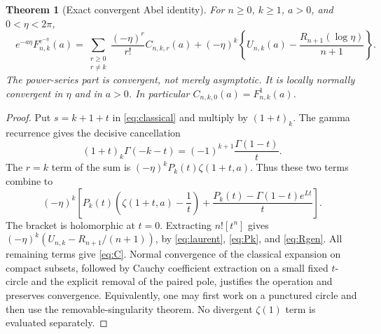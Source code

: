 \documentclass[11pt,letterpaper]{article}
\numberwithin{equation}{section}
\newtheorem{theorem}{Theorem}[section]
\theoremstyle{definition}\newtheorem{definition}[theorem]{Definition}
\theoremstyle{remark}\newtheorem{remark}[theorem]{Remark}
\newcommand{\F}[3]{F_{#1,#2}^{#3}}
\newcommand{\coef}[2]{[#1^{#2}]}
\begin{document}
\begin{theorem}[Exact convergent Abel identity]\label{thm:abel}
For $n\ge0$, $k\ge1$, $a>0$, and $0<\eta<2\pi$,
\begin{equation}\label{eq:abel}
 \boxed{\quad
 e^{-a\eta}\F nk{e^{-\eta}}(a)
 =\sum_{\substack{r\ge0\\r\ne k}}
       \frac{(-\eta)^r}{r!}C_{n,k,r}(a)
  +(-\eta)^k\left\{U_{n,k}(a)-\frac{R_{n+1}(\log\eta)}{n+1}\right\}.
 \quad}
\end{equation}
The power-series part is convergent, not merely asymptotic. It is locally normally convergent in $\eta$ and in $a>0$. In particular $C_{n,k,0}(a)=\F nk1(a)$.
\end{theorem}
\begin{proof}
Put $s=k+1+t$ in \eqref{eq:classical} and multiply by $(1+t)_k$. The gamma recurrence gives the decisive cancellation
\begin{equation}\label{eq:universal-cancel}
 (1+t)_k\Gamma(-k-t)=(-1)^{k+1}\frac{\Gamma(1-t)}t.
\end{equation}
The $r=k$ term of the sum is $(-\eta)^kP_k(t)\zeta(1+t,a)$. Thus these two terms combine to
\[
 (-\eta)^k\left[
 P_k(t)\left(\zeta(1+t,a)-\frac1t\right)
 +\frac{P_k(t)-\Gamma(1-t)e^{Lt}}t\right].
\]
The bracket is holomorphic at $t=0$. Extracting $n!\coef tn$ gives $(-\eta)^k(U_{n,k}-R_{n+1}/(n+1))$, by \eqref{eq:laurent}, \eqref{eq:Pk}, and \eqref{eq:Rgen}. All remaining terms give \eqref{eq:C}. Normal convergence of the classical expansion on compact subsets, followed by Cauchy coefficient extraction on a small fixed $t$-circle and the explicit removal of the paired pole, justifies the operation and preserves convergence. Equivalently, one may first work on a punctured circle and then use the removable-singularity theorem. No divergent $\zeta(1)$ term is evaluated separately.
\end{proof}
\end{document}

